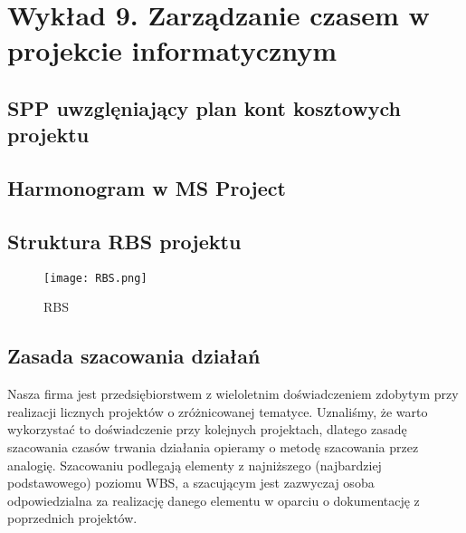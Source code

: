 \chapter{Wykład 9. Zarządzanie czasem w projekcie informatycznym}

\section{SPP uwzglęniający plan kont kosztowych projektu}




\section{Harmonogram w MS Project}




\begin{landscape}

\section{Struktura RBS projektu}

\begin{figure}[!h]
\centering
\texttt{[image: RBS.png]}
\caption[RBS]{RBS}
\label{rysunekProces}
\end{figure}

\end{landscape}

\section{Zasada szacowania działań}
Nasza firma jest przedsiębiorstwem z wieloletnim doświadczeniem zdobytym przy realizacji licznych projektów o zróżnicowanej tematyce. Uznaliśmy, że warto wykorzystać to doświadczenie przy kolejnych projektach, dlatego zasadę szacowania czasów trwania działania opieramy o metodę szacowania przez analogię. Szacowaniu podlegają elementy z najniższego (najbardziej podstawowego) poziomu WBS, a szacującym jest zazwyczaj osoba odpowiedzialna za realizację danego elementu w oparciu o dokumentację z poprzednich projektów. 

